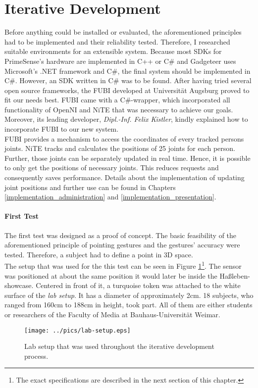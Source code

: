
\section{Iterative Development}
\label{installation_testing}

Before anything could be installed or evaluated, the aforementioned principles had to be implemented and their reliability tested. Therefore, I researched suitable environments for an extensible system. Because most \ac{SDK}s for PrimeSense's hardware are implemented in C++ or C$\#$ and Gadgeteer uses Microsoft's .NET framework and C$\#$, the final system should be implemented in C$\#$. However, an \ac{SDK} written in C$\#$ was to be found. After having tried several open source frameworks, the \ac{FUBI} developed at Universität Augsburg proved to fit our needs best. \ac{FUBI} came with a C$\#$-wrapper, which incorporated all functionality of OpenNI and NiTE that was necessary to achieve our goals. Moreover, its leading developer, \textit{Dipl.-Inf. Felix Kistler}, kindly explained how to incorporate \ac{FUBI} to our new system. 
\\
\ac{FUBI} provides a mechanism to access the coordinates of every tracked persons joints. NiTE tracks and calculates the positions of 25 joints for each person. Further, those joints can be separately updated in real time. Hence, it is possible to only get the positions of necessary joints. This reduces requests and consequently saves performance. Details about the implementation of updating joint positions and further use can be found in Chapters \ref{implementation_administration} and \ref{implementation_presentation}.

\paragraph{First Test} The first test was designed as a proof of concept. The basic feasibility of the aforementioned principle of pointing gestures and the gestures' accuracy were tested. Therefore, a subject had to define a point in \ac{3D} space.
\\ 
The setup that was used for the this test can be seen in Figure \ref{fig:testing_1}\footnote{The exact specifications are described in the next section of this chapter.}. The sensor was positioned at about the same position it would later be inside the Haßleben-showcase. Centered in front of it, a turquoise token was attached to the white surface of the \textit{lab setup}. It has a diameter of approximately 2cm. 18 subjects, who ranged from 160cm to 188cm in height, took part. All of them are either students or researchers of the Faculty of Media at Bauhaus-Universität Weimar.
\begin{figure}[H]%
\texttt{[image: ../pics/lab-setup.eps]}%
\caption{Lab setup that was used throughout the iterative development process.}%
\label{fig:testing_1}%
\end{figure}


